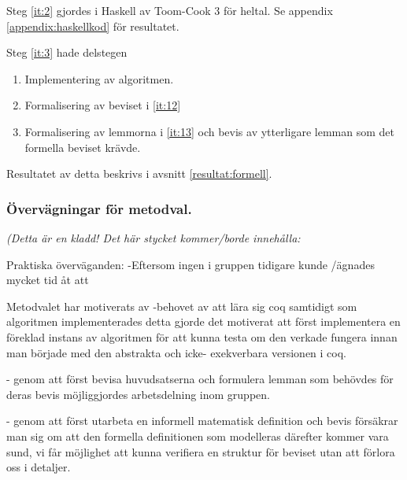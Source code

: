 Steg \ref{it:2} gjordes i Haskell av Toom-Cook 3 för heltal. Se appendix \ref{appendix:haskellkod} för resultatet.

Steg \ref{it:3} hade delstegen
\begin{enumerate}
 \item Implementering av algoritmen.
 \item Formalisering av beviset i \ref{it:12}
 \item Formalisering av lemmorna i \ref{it:13} och bevis av ytterligare lemman som det formella beviset krävde.
\end{enumerate}
Resultatet av detta beskrivs i avsnitt \ref{resultat:formell}.

\subsubsection{Övervägningar för metodval.}
\emph{(Detta är en kladd! Det här stycket kommer/borde innehålla: }

Praktiska överväganden:
-Eftersom ingen i gruppen tidigare kunde \coq/\ssr ägnades mycket tid åt att

Metodvalet har motiverats av
-behovet av att lära sig coq samtidigt som algoritmen implementerades
detta gjorde det motiverat att först implementera en föreklad instans av algoritmen för
att kunna testa om den verkade fungera innan man började med den abstrakta och icke-
exekverbara versionen i coq.

- genom att först bevisa huvudsatserna och formulera lemman som behövdes för deras bevis
möjliggjordes arbetsdelning inom gruppen.

- genom att först utarbeta en informell matematisk definition och bevis försäkrar man sig om
att den formella definitionen som modelleras därefter kommer vara sund, vi får möjlighet
att kunna verifiera en struktur för beviset utan att förlora oss i detaljer.

